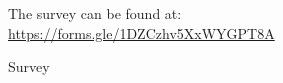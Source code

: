 \documentclass[oneside]{report}
\begin{document}
		\begin{figure}[H]%
			\centering
			\qquad
			\caption{Survey}%
			\label{Survey}%
			The survey can be found at: \url{https://forms.gle/1DZCzhv5XxWYGPT8A}
		\end{figure}
\end{document}
